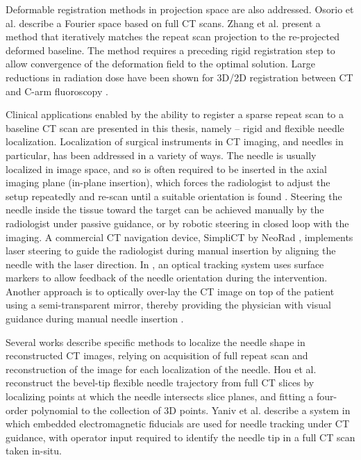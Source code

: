 Deformable registration methods in projection space are also addressed. 
Osorio et al. \cite{osorio2007non} describe a Fourier space based on full CT scans.
Zhang et al. \cite{zhang2014few} present a method that iteratively matches the repeat scan projection to the re-projected deformed baseline. The method requires a preceding rigid registration step to allow convergence of the deformation field to the optimal solution.  
Large reductions in radiation dose have been shown for 3D/2D registration between CT and C-arm fluoroscopy \cite{uneri2014evaluation}.

Clinical applications enabled by the ability to register a sparse repeat scan to a baseline CT scan are presented in this thesis, namely -- rigid and flexible needle localization. Localization of surgical instruments in CT imaging, and needles in particular, has been addressed in a variety of ways. The needle is usually localized in image space, and so is often required to be inserted in the axial imaging plane (in-plane insertion), which forces the radiologist to adjust the setup repeatedly and re-scan until a suitable orientation is found \cite{walsh2011smaller}. Steering the needle inside the tissue toward the target can be achieved manually by the radiologist under passive guidance, or by robotic steering in closed loop with the imaging. A commercial CT navigation device, SimpliCT by NeoRad \cite{simpliCT}, implements laser steering to guide the radiologist during manual insertion by aligning the needle with the laser direction. In \cite{schubert2013ct}, an optical tracking system uses surface markers to allow feedback of the needle orientation during the intervention. Another approach is to optically over-lay the CT image on top of the patient using a semi-transparent mirror, thereby providing the physician with visual guidance during manual needle insertion \cite{fichtinger2005image}.

Several works describe specific methods to localize the needle shape in reconstructed CT images, relying on acquisition of full repeat scan and reconstruction of the image for each localization of the needle.
Hou et al. \cite{huo2015shape} reconstruct the bevel-tip flexible needle trajectory from full CT slices by localizing points at which the needle intersects slice planes, and fitting a four-order polynomial to the collection of 3D points.
Yaniv et al. \cite{yaniv2010needle} describe a system in which embedded electromagnetic fiducials are used for needle tracking under CT guidance, with operator input required to identify the needle tip in a full CT scan taken in-situ.

